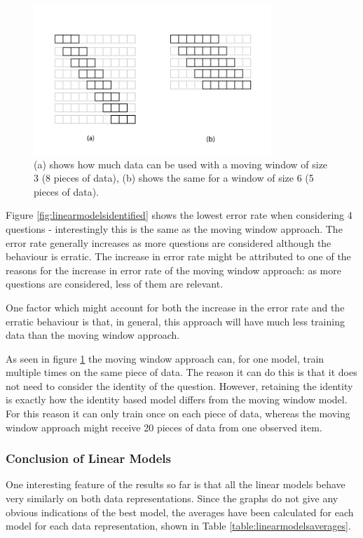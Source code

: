 \begin{figure}[h!]
\centering
\includegraphics[width=0.8\textwidth]{images/movingwindowdata.png}
\caption{(a) shows how much data can be used with a moving window of size 3 (8 pieces of data), (b) shows the same for a window of size 6 (5 pieces of data).}
\label{fig:movingwindowdata}
\end{figure}

Figure \ref{fig:linearmodelsidentified} shows the lowest error rate when considering 4 questions - interestingly this is the same as the moving window approach. The error rate generally increases as more questions are considered although the behaviour is erratic.
The increase in error rate might be attributed to one of the reasons for the increase in error rate of the moving window approach: as more questions are considered, less of them are relevant.

One factor which might account for both the increase in the error rate and the erratic behaviour is that, in general, this approach will have much less training data than the moving window approach.

As seen in figure \ref{fig:movingwindowdata} the moving window approach can, for one model, train multiple times on the same piece of data. The reason it can do this is that it does not need to consider the identity of the question. However, retaining the identity is exactly how the identity based model differs from the moving window model. For this reason it can only train once on each piece of data, whereas the moving window approach might receive 20 pieces of data from one observed item.

\subsubsection{Conclusion of Linear Models}
One interesting feature of the results so far is that all the linear models behave very similarly on both data representations. Since the graphs do not give any obvious indications of the best model, the averages have been calculated for each model for each data representation, shown in Table \ref{table:linearmodelsaverages}.

